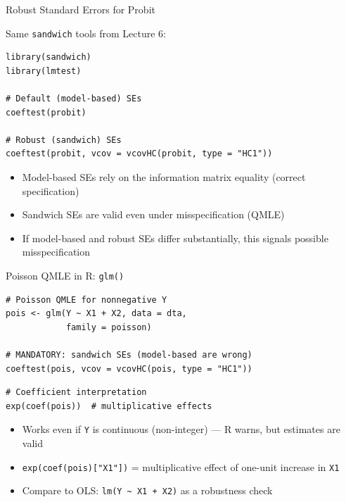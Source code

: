 \documentclass[aspectratio=169]{beamer}
\numberwithin{equation}{section}
\begin{document}

\begin{frame}[fragile]{Robust Standard Errors for Probit}

Same \texttt{sandwich} tools from Lecture 6:

\begin{lstlisting}
library(sandwich)
library(lmtest)

# Default (model-based) SEs
coeftest(probit)

# Robust (sandwich) SEs
coeftest(probit, vcov = vcovHC(probit, type = "HC1"))
\end{lstlisting}

\pause

\bigskip

\begin{itemize}
    \item Model-based SEs rely on the information matrix equality (correct specification)
    \item Sandwich SEs are valid even under misspecification (QMLE)
    \item If model-based and robust SEs differ substantially, this signals possible misspecification
\end{itemize}

\end{frame}


\begin{frame}[fragile]{Poisson QMLE in R: \texttt{glm()}}

\begin{lstlisting}
# Poisson QMLE for nonnegative Y
pois <- glm(Y ~ X1 + X2, data = dta,
            family = poisson)

# MANDATORY: sandwich SEs (model-based are wrong)
coeftest(pois, vcov = vcovHC(pois, type = "HC1"))
\end{lstlisting}

\pause

\bigskip

\begin{lstlisting}
# Coefficient interpretation
exp(coef(pois))  # multiplicative effects
\end{lstlisting}

\pause

\bigskip

\begin{itemize}
    \item Works even if \texttt{Y} is continuous (non-integer) --- R warns, but estimates are valid
    \item \texttt{exp(coef(pois)["X1"])} = multiplicative effect of one-unit increase in \texttt{X1}
    \item Compare to OLS: \texttt{lm(Y \~{} X1 + X2)} as a robustness check
\end{itemize}

\end{frame}
\end{document}
